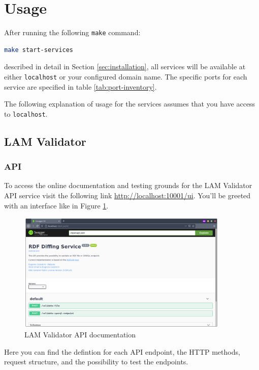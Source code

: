 \section{Usage}
\label{sec:usage}

After running the following \texttt{make} command:

\begin{lstlisting}[language=bash,]
make start-services
\end{lstlisting}

described in detail in Section \ref{sec:installation}, all services will be available at either \texttt{localhost} or your configured domain name. The specific ports for each service are specified in table \ref{tab:port-inventory}. 

The following explanation of usage for the services assumes that you have access to \texttt{localhost}. 

\subsection{LAM Validator}
\subsubsection{API}
To access the online documentation and testing grounds for the LAM Validator API service visit the following link \url{http://localhost:10001/ui}. You'll be greeted with an interface like in Figure \ref{fig:validator-api-documentation}.

\begin{figure}[H]
  \centering
  \includegraphics[width=0.9\textwidth]{images/usage/validator-api.png}
  \caption{LAM Validator API documentation}
  \label{fig:validator-api-documentation}
\end{figure} 

Here you can find the defintion for each API endpoint, the HTTP methods, request structure, and the possibility to test the endpoints.


